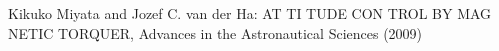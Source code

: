 \begin{thebibliography}{99}
	Kikuko Miyata and Jozef C. van der Ha:
	AT TI TUDE CON TROL BY MAG NETIC TORQUER,
	Advances in the Astronautical Sciences (2009)

	
	

	
	
	
	
	
	
	
\end{thebibliography}

